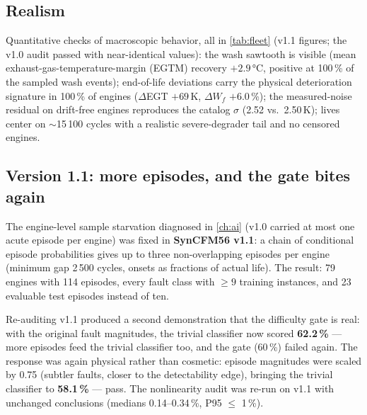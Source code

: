 \begin{table}[htbp]
  \centering\small
  \caption{Difficulty audit on the final fleet (trivial classifier: multinomial logistic on
  raw measured channels). Auto-generated.}
  \label{tab:difficulty-audit}
  
\end{table}

\subsection{Realism}
\label{sec:audit-realism}

Quantitative checks of macroscopic behavior, all in \cref{tab:fleet} (v1.1 figures; the
v1.0 audit passed with near-identical values): the wash sawtooth is
visible (mean exhaust-gas-temperature-margin (EGTM) recovery $+2.9$\,\si{\degreeCelsius},
positive at 100\,\% of the sampled wash events); end-of-life deviations carry the physical
deterioration signature in
100\,\% of engines ($\Delta$EGT $+69$\,K, $\Delta W_f$ $+6.0$\,\%); the measured-noise
residual on drift-free engines reproduces the catalog $\sigma$ (2.52 vs.\ 2.50\,K); lives
center on $\sim$15\,100 cycles with a realistic severe-degrader tail and no censored engines.

\subsection{Version 1.1: more episodes, and the gate bites again}
\label{sec:fleet-v11}

The engine-level sample starvation diagnosed in \cref{ch:ai} (v1.0 carried at most one acute
episode per engine) was fixed in \textbf{SynCFM56 v1.1}: a chain of conditional episode
probabilities gives up to three non-overlapping episodes per engine (minimum gap 2\,500
cycles, onsets as fractions of actual life). The result: 79 engines with 114 episodes,
every fault class with $\geq 9$ training instances, and 23 evaluable test episodes instead
of ten.

Re-auditing v1.1 produced a second demonstration that the difficulty gate is real: with the
original fault magnitudes, the trivial classifier now scored \textbf{62.2\,\%} --- more
episodes feed the trivial classifier too, and the gate (60\,\%) failed again. The response
was again physical rather than cosmetic: episode magnitudes were scaled by 0.75 (subtler
faults, closer to the detectability edge), bringing the trivial classifier to
\textbf{58.1\,\%} --- pass. The nonlinearity audit was re-run on v1.1 with unchanged
conclusions (medians 0.14--0.34\,\%, P95 $\leq$ 1\,\%).

